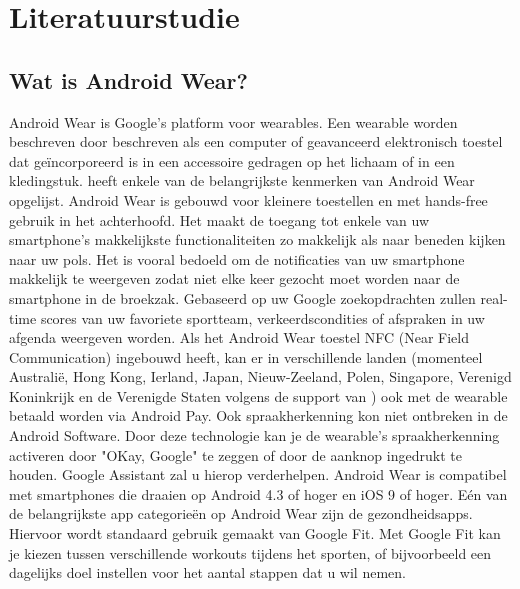 

\chapter{Literatuurstudie}
\label{ch:literatuurstudie}

\section{Wat is Android Wear?}
\label{sec:androidwear}
Android Wear is Google's platform voor wearables. Een wearable worden beschreven door \textcite{Dictionary} beschreven als een computer of geavanceerd elektronisch toestel dat geïncorporeerd is in een accessoire gedragen op het lichaam of in een kledingstuk. 
\textcite{Techradar} heeft enkele van de belangrijkste kenmerken van Android Wear opgelijst.
Android Wear is gebouwd voor kleinere toestellen en met hands-free gebruik in het achterhoofd. Het maakt de toegang tot enkele van uw smartphone's makkelijkste functionaliteiten zo makkelijk als naar beneden kijken naar uw pols. Het is vooral bedoeld om de notificaties van uw smartphone makkelijk te weergeven zodat niet elke keer gezocht moet worden naar de smartphone in de broekzak. Gebaseerd op uw Google zoekopdrachten zullen real-time scores van uw favoriete sportteam, verkeerdscondities of afspraken in uw afgenda weergeven worden. Als het Android Wear toestel NFC (Near Field Communication) ingebouwd heeft, kan er in verschillende landen (momenteel Australië, Hong Kong, Ierland, Japan, Nieuw-Zeeland, Polen, Singapore, Verenigd Koninkrijk en de Verenigde Staten volgens de support van \cite{Androidpay}) ook met de wearable betaald worden via Android Pay. Ook spraakherkenning kon niet ontbreken in de Android Software. Door deze technologie kan je de wearable's spraakherkenning activeren door "OKay, Google" te zeggen of door de aanknop ingedrukt te houden. Google Assistant zal u hierop verderhelpen. Android Wear is compatibel met smartphones die draaien op Android 4.3 of hoger en iOS 9 of hoger. Eén van de belangrijkste app categorieën op Android Wear zijn de gezondheidsapps. Hiervoor wordt standaard gebruik gemaakt van Google Fit. Met Google Fit kan je kiezen tussen verschillende workouts tijdens het sporten, of bijvoorbeeld een dagelijks doel instellen voor het aantal stappen dat u wil nemen.  
